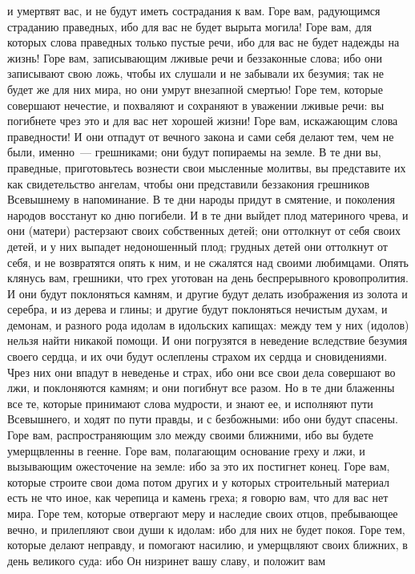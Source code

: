 и умертвят вас, и не будут иметь сострадания к вам.
Горе вам, радующимся страданию праведных, ибо для вас не будет вырыта
могила!
Горе вам, для которых слова праведных только пустые речи, ибо для вас
не будет надежды на жизнь!
Горе вам, записывающим лживые речи и беззаконные слова; ибо они
записывают свою ложь, чтобы их слушали и не забывали их безумия; так не будет
же для них мира, но они умрут внезапной смертью!
Горе тем, которые совершают нечестие, и похваляют и сохраняют в
уважении лживые речи: вы погибнете чрез это и для вас нет хорошей жизни!
Горе вам, искажающим слова праведности!
И они отпадут от вечного закона и сами себя делают тем, чем не были,
именно~--- грешниками; они будут попираемы на земле.
В те дни вы, праведные, приготовьтесь вознести свои мысленные молитвы,
вы представите их как свидетельство ангелам, чтобы они представили беззакония
грешников Всевышнему в напоминание.
В те дни народы придут в смятение, и поколения народов восстанут ко
дню погибели.
И в те дни выйдет плод материного чрева, и они (матери) растерзают
своих собственных детей; они оттолкнут от себя своих детей, и у них выпадет
недоношенный плод; грудных детей они оттолкнут от себя, и не возвратятся опять
к ним, и не сжалятся над своими любимцами.
Опять клянусь вам, грешники, что грех уготован на день беспрерывного
кровопролития.
И они будут поклоняться камням, и другие будут делать изображения из
золота и серебра, и из дерева и глины; и другие будут поклоняться нечистым
духам, и демонам, и разного рода идолам в идольских капищах: между тем у них
(идолов) нельзя найти никакой помощи.
И они погрузятся в неведение вследствие безумия своего сердца, и их
очи будут ослеплены страхом их сердца и сновидениями.
Чрез них они впадут в неведенье и страх, ибо они все свои дела
совершают во лжи, и поклоняются камням; и они погибнут все разом.
Но в те дни блаженны все те, которые принимают слова мудрости, и знают
ее, и исполняют пути Всевышнего, и ходят по пути правды, и с безбожными: ибо
они будут спасены.
Горе вам, распространяющим зло между своими ближними, ибо вы будете
умерщвленны в геенне.
Горе вам, полагающим основание греху и лжи, и вызывающим ожесточение
на земле: ибо за это их постигнет конец.
Горе вам, которые строите свои дома потом других и у которых
строительный материал есть не что иное, как черепица и камень греха; я говорю
вам, что для вас нет мира.
Горе тем, которые отвергают меру и наследие своих отцов, пребывающее
вечно, и прилепляют свои души к идолам: ибо для них не будет покоя.
Горе тем, которые делают неправду, и помогают насилию, и умерщвляют
своих ближних, в день великого суда: ибо Он низринет вашу славу, и положит вам
